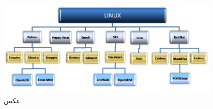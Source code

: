 \begin{figure}
	\centering
	\includegraphics[width=1.0\linewidth]{image}
	\caption[عکس]{عکس}
	\label{fig:image}
\end{figure}

